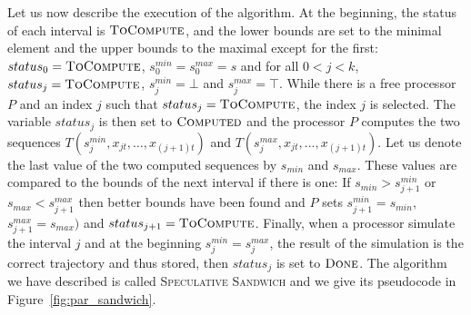 \documentclass[a4paper,10pt]{article}
\newcommand{\todo}[1]{{\color{red} TODO: {#1}}}
\begin{document}
Let us now describe the execution of the algorithm. At the beginning, the status of each interval is $\textsc{ToCompute}$, and the lower bounds are set to the minimal element and the upper bounds to the maximal except for the first: 
$status_0 = \textsc{ToCompute}$, $s_0^{min} = s_0^{max} = s$ and for all $0 < j < k$, $status_j = \textsc{ToCompute}$,  $s_j^{min} = \bot$ and $s_j^{max} = \top$. 
While there is a free processor $P$ and an index $j$ such that $status_j = \textsc{ToCompute}$, the index $j$ is selected. The variable $status_j$ is then set to $\textsc{Computed}$ and the processor $P$ computes the two sequences $T(s_j^{min},x_{jt},\dots,x_{(j+1)t})$ and $T(s_j^{max},x_{jt},\dots,x_{(j+1)t})$. 
Let us denote the last value of the two computed sequences by $s_{min}$ and $s_{max}$. These values are compared to the bounds of the next interval if there is one: If $s_{min} > s_{j+1}^{min}$ or $ s_{max} < s_{j+1}^{max}$ then better bounds have been found and $P$ sets $s_{j+1}^{min} = s_{min}$, $s_{j+1}^{max} = s_{max})$ and $status_{j+1} = \textsc{ToCompute}$.
Finally, when a processor simulate the interval $j$ and at the beginning $s_j^{min} = s_j^{max}$, the result of the simulation is  the correct trajectory and thus stored, then $status_j$ is set to $\textsc{Done}$.
The algorithm we have described is called \textsc{Speculative Sandwich} and we give its pseudocode in Figure~\ref{fig:par_sandwich}.
% 
%  
%  
 
\end{document}
